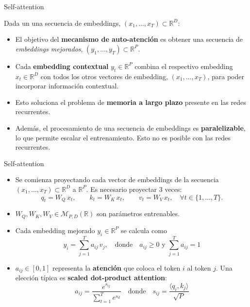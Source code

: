 \documentclass{beamer}
\newcommand{\R}{\mathbb{R}}
\begin{document}
\begin{frame}{Self-attention}

    Dada un una secuencia de embeddings, $(x_1,\ldots,x_T)\subset\R^D$:

    \begin{itemize}
        \item El objetivo del \textbf{mecanismo de auto-atención} es obtener una secuencia de \textit{embeddings mejorados}, $(y_1,\ldots,y_T)\subset\R^P$.
        \item Cada \textbf{embedding contextual} $y_t\in\R^P$ combina el respectivo embedding $x_t\in\R^D$ con todos los otros vectores de embedding, $(x_1,\ldots,x_T)$, para poder incorporar información contextual.
        \item Esto soluciona el problema de \textbf{memoria a largo plazo} presente en las redes recurrentes.
        \item Además, el procesamiento de una secuencia de embeddings es \textbf{paralelizable}, lo que permite escalar el entrenamiento. Esto no es posible con las redes recurrentes.
    \end{itemize}

\end{frame}

\begin{frame}{Self-attention}
    \begin{itemize}
        \item Se comienza proyectando cada vector de embeddings de la secuencia $(x_1,\ldots,x_T)\subset\R^D$ a $\R^P$.
              Es necesario proyectar 3 veces:
              \begin{equation*}
                  q_t=W_Q\,x_t,
                  \qquad
                  k_t=W_K\,x_t,
                  \qquad
                  v_t=W_V\,x_t,
                  \quad\forall t\in\{1,\ldots,T\}.
              \end{equation*}
        \item $W_Q,W_K,W_V\in\mathcal{M}_{P,D}(\R)$ son parámetros entrenables.
        \item Cada embedding mejorado $y_i\in\R^P$ se calcula como
              \begin{equation*}
                  y_i=\sum_{j=1}^T a_{ij}\,v_j,
                  \quad\text{donde}\quad  a_{ij}\geq 0 \text{ y } \sum_{j=1}^T a_{ij}=1
              \end{equation*}
        \item $a_{ij}\in[0,1]$ representa la \textbf{atención} que coloca el token $i$ al token $j$. Una elección típica es \textbf{scaled dot-product attention}:
              \begin{equation*}
                  a_{ij}= \frac{e^{s_{ij}}}{\sum_{t=1}^T e^{s_{it}}}
                  \quad\text{donde}\quad
                  s_{ij}=\frac{\langle q_i,k_j\rangle}{\sqrt{P}}
              \end{equation*}
    \end{itemize}
\end{frame}
\end{document}

